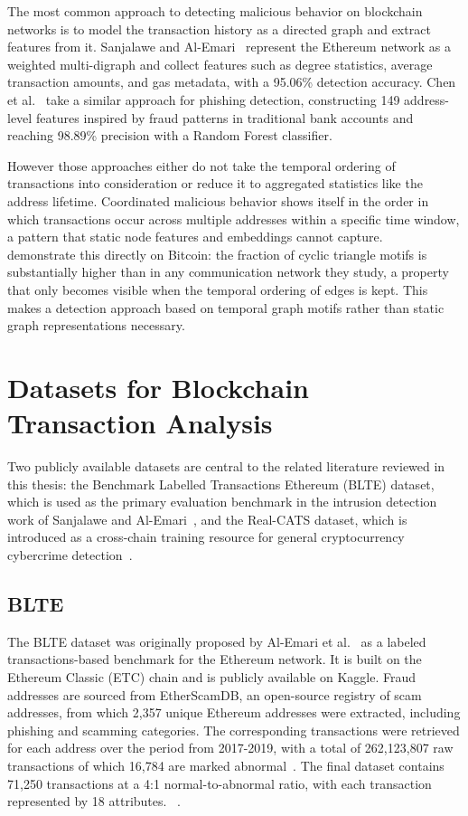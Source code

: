 \documentclass{thesisclass}
\begin{document}
The most common approach to detecting malicious behavior on blockchain networks is
to model the transaction history as a directed graph and extract features from it.
Sanjalawe and Al-Emari~\cite{sanjalawe2023atd} represent the Ethereum network
as a weighted multi-digraph and collect features such as degree statistics,
average transaction amounts, and gas metadata, with a 95.06\% detection accuracy.
Chen et al.~\cite{chen2022phishing} take a similar approach for phishing detection,
constructing 149 address-level features inspired by fraud patterns in traditional
bank accounts and reaching 98.89\% precision with a Random Forest classifier.

However those approaches either do not take the temporal ordering of
transactions into consideration or reduce it to aggregated statistics like the address lifetime.
Coordinated malicious behavior shows itself in the order in which transactions
occur across multiple addresses within a specific time window, a pattern that
static node features and embeddings cannot capture.
~\cite{paranjape2017motifs} demonstrate this directly on Bitcoin:
the fraction of cyclic triangle motifs is substantially higher than in any
communication network they study, a property that only becomes visible when the
temporal ordering of edges is kept.
This makes a detection approach based on temporal graph motifs rather than
static graph representations necessary.

\section{Datasets for Blockchain Transaction Analysis}
\label{sec:relwork_datasets}

Two publicly available datasets are central to the related literature reviewed in this
thesis: the Benchmark Labelled Transactions Ethereum (BLTE) dataset, which is used
as the primary evaluation benchmark in the intrusion detection work of
Sanjalawe and Al-Emari~\cite{sanjalawe2023atd}, and the Real-CATS dataset,
which is introduced as a cross-chain training resource for general cryptocurrency
cybercrime detection~\cite{shi2025realcats}.

\subsection*{BLTE}

The BLTE dataset was originally proposed by Al-Emari et al.~\cite{alemari2021labeled}
as a labeled transactions-based benchmark for the Ethereum network.
It is built on the Ethereum Classic (ETC) chain and is publicly available on
Kaggle.
Fraud addresses are sourced from EtherScamDB, an open-source registry of scam
addresses, from which 2{,}357 unique Ethereum addresses were extracted,
including phishing and scamming categories.
The corresponding transactions were retrieved for each address over the period from
2017-2019, with a total of 262{,}123{,}807 raw transactions of which
16{,}784 are marked abnormal~\cite{alemari2021labeled}.
The final dataset contains 71{,}250 transactions
at a 4:1 normal-to-abnormal ratio, with each transaction represented by 18 attributes.
~\cite{alemari2021labeled}.
\end{document}

